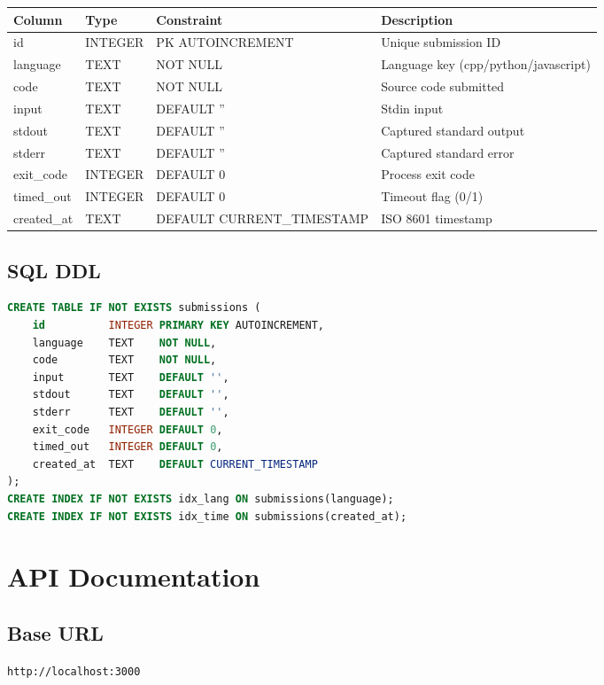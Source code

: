 \documentclass[12pt,a4paper]{report}
\begin{document}
\begin{longtable}{@{}p{2.5cm}p{2.5cm}p{3cm}p{5.5cm}@{}}
\toprule
\textbf{Column} & \textbf{Type} & \textbf{Constraint} & \textbf{Description} \\
\midrule
id & INTEGER & PK AUTOINCREMENT & Unique submission ID \\
language & TEXT & NOT NULL & Language key (cpp/python/javascript) \\
code & TEXT & NOT NULL & Source code submitted \\
input & TEXT & DEFAULT '' & Stdin input \\
stdout & TEXT & DEFAULT '' & Captured standard output \\
stderr & TEXT & DEFAULT '' & Captured standard error \\
exit\_code & INTEGER & DEFAULT 0 & Process exit code \\
timed\_out & INTEGER & DEFAULT 0 & Timeout flag (0/1) \\
created\_at & TEXT & DEFAULT CURRENT\_TIMESTAMP & ISO 8601 timestamp \\
\bottomrule
\end{longtable}

\section{SQL DDL}
\begin{lstlisting}[language=SQL]
CREATE TABLE IF NOT EXISTS submissions (
    id          INTEGER PRIMARY KEY AUTOINCREMENT,
    language    TEXT    NOT NULL,
    code        TEXT    NOT NULL,
    input       TEXT    DEFAULT '',
    stdout      TEXT    DEFAULT '',
    stderr      TEXT    DEFAULT '',
    exit_code   INTEGER DEFAULT 0,
    timed_out   INTEGER DEFAULT 0,
    created_at  TEXT    DEFAULT CURRENT_TIMESTAMP
);
CREATE INDEX IF NOT EXISTS idx_lang ON submissions(language);
CREATE INDEX IF NOT EXISTS idx_time ON submissions(created_at);
\end{lstlisting}

\chapter{API Documentation}

\section{Base URL}
\texttt{http://localhost:3000}
\end{document}
